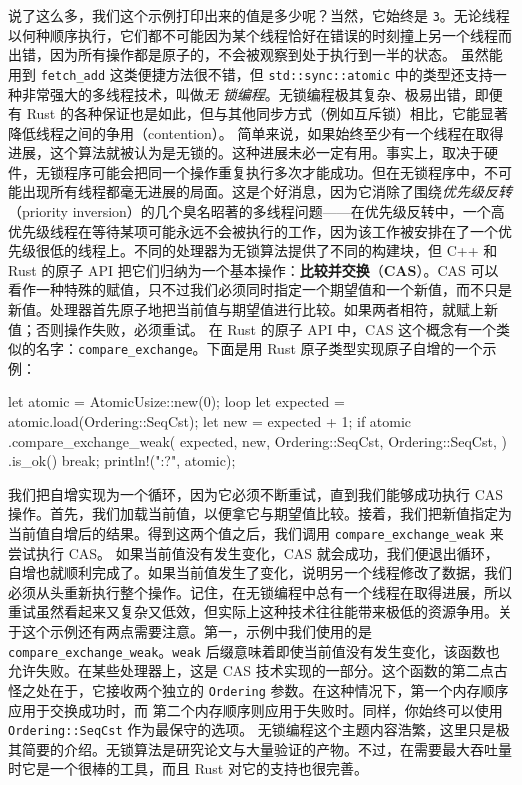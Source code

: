 说了这么多，我们这个示例打印出来的值是多少呢？当然，它始终是 \texttt{3}。无论线程以何种顺序执行，它们都不可能因为某个线程恰好在错误的时刻撞上另一个线程而出错，因为所有操作都是原子的，不会被观察到处于执行到一半的状态。
虽然能用到 \texttt{fetch\_add} 这类便捷方法很不错，但
\texttt{std::\allowbreak{}sync::\allowbreak{}atomic} 中的类型还支持一种非常强大的多线程技术，叫做\emph{无}
\emph{锁编程}。无锁编程极其复杂、极易出错，即便有 Rust 的各种保证也是如此，但与其他同步方式（例如互斥锁）相比，它能显著降低线程之间的争用（contention）。
\label{idx:idx_09feb77e}
\label{idx:idx_413b903f}
\label{idx:idx_5af8ba80}
\label{idx:idx_2d2581e1}
\label{idx:idx_08a0968b}
简单来说，如果始终至少有一个线程在取得进展，这个算法就被认为是无锁的。这种进展未必一定有用。事实上，取决于硬件，无锁程序可能会把同一个操作重复执行多次才能成功。但在无锁程序中，不可能出现所有线程都毫无进展的局面。这是个好消息，因为它消除了围绕\emph{优先级反转}（priority inversion）的几个臭名昭著的多线程问题——在优先级反转中，一个高优先级线程在等待某项可能永远不会被执行的工作，因为该工作被安排在了一个优先级很低的线程上。不同的处理器为无锁算法提供了不同的构建块，但 C++ 和 Rust 的原子 API 把它们归纳为一个基本操作：\textbf{比较并交换}（\textbf{CAS}）。CAS 可以看作一种特殊的赋值，只不过我们必须同时指定一个期望值和一个新值，而不只是新值。处理器首先原子地把当前值与期望值进行比较。如果两者相符，就赋上新值；否则操作失败，必须重试。
在 Rust 的原子 API 中，CAS 这个概念有一个类似的名字：\texttt{compare\_\allowbreak{}exchange}。下面是用 Rust 原子类型实现原子自增的一个示例：
\begin{codebox}[rust]
let atomic = AtomicUsize::new(0);
loop {
      let expected = atomic.load(Ordering::SeqCst);
      let new = expected + 1;
      if atomic
            .compare_exchange_weak(
                  expected,
                  new,
                  Ordering::SeqCst,
                  Ordering::SeqCst,
            )
            .is_ok()
      {
            break;
      }
}
println!("{:?}", atomic);
\end{codebox}
我们把自增实现为一个循环，因为它必须不断重试，直到我们能够成功执行 CAS 操作。首先，我们加载当前值，以便拿它与期望值比较。接着，我们把新值指定为当前值自增后的结果。得到这两个值之后，我们调用 \texttt{compare\_\allowbreak{}exchange\_\allowbreak{}weak} 来尝试执行 CAS。
\label{idx:idx_ebe378b8}
\label{idx:idx_5a85701a}
\label{idx:idx_2029366c}
\label{idx:idx_e2ed7d77}
如果当前值没有发生变化，CAS 就会成功，我们便退出循环，自增也就顺利完成了。如果当前值发生了变化，说明另一个线程修改了数据，我们必须从头重新执行整个操作。记住，在无锁编程中总有一个线程在取得进展，所以重试虽然看起来又复杂又低效，但实际上这种技术往往能带来极低的资源争用。关于这个示例还有两点需要注意。第一，示例中我们使用的是 \texttt{compare\_\allowbreak{}exchange\_\allowbreak{}weak}。\texttt{weak} 后缀意味着即使当前值没有发生变化，该函数也允许失败。在某些处理器上，这是 CAS 技术实现的一部分。这个函数的第二点古怪之处在于，它接收两个独立的
\texttt{Ordering} 参数。在这种情况下，第一个内存顺序应用于交换成功时，而
第二个内存顺序则应用于失败时。同样，你始终可以使用 \texttt{Ordering::\allowbreak{}SeqCst} 作为最保守的选项。
无锁编程这个主题内容浩繁，这里只是极其简要的介绍。无锁算法是研究论文与大量验证的产物。不过，在需要最大吞吐量时它是一个很棒的工具，而且 Rust 对它的支持也很完善。
